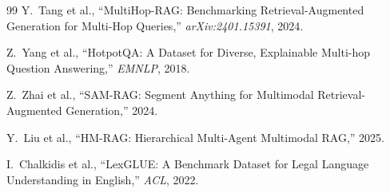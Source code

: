 \documentclass[12pt,a4paper]{article}
\theoremstyle{definition}
\theoremstyle{plain}
\theoremstyle{remark}
\begin{document}
\begin{thebibliography}{99}
Y.\ Tang et al., ``MultiHop-RAG: Benchmarking Retrieval-Augmented Generation for Multi-Hop Queries,'' \textit{arXiv:2401.15391}, 2024.

Z.\ Yang et al., ``HotpotQA: A Dataset for Diverse, Explainable Multi-hop Question Answering,'' \textit{EMNLP}, 2018.

Z.\ Zhai et al., ``SAM-RAG: Segment Anything for Multimodal Retrieval-Augmented Generation,'' 2024.

Y.\ Liu et al., ``HM-RAG: Hierarchical Multi-Agent Multimodal RAG,'' 2025.

I.\ Chalkidis et al., ``LexGLUE: A Benchmark Dataset for Legal Language Understanding in English,'' \textit{ACL}, 2022.

\end{thebibliography}
\end{document}

